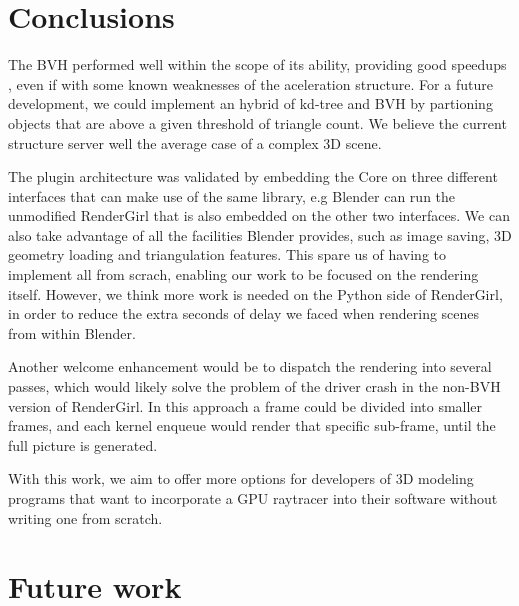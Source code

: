 \documentclass{vgtc}
\begin{document}
\section{Conclusions}
\label{sec:conclusion}

The BVH performed well within the scope of its ability, providing good
speedups , even if with some known weaknesses of the aceleration
structure. For a future development, we could implement an hybrid of
kd-tree and BVH by partioning objects that are above a given threshold
of triangle count. We believe the current structure server well the
average case of a complex 3D scene.

The plugin architecture was validated by embedding the Core on three
different interfaces that can make use of the same library, e.g
Blender can run the unmodified RenderGirl that is also embedded on the
other two interfaces. We can also take advantage of all the facilities
Blender provides, such as image saving, 3D geometry loading and
triangulation features. This spare us of having to implement all from
scrach, enabling our work to be focused on the rendering
itself. However, we think more work is needed on the Python side of
RenderGirl, in order to reduce the extra seconds of delay we faced
when rendering scenes from within Blender.

Another welcome enhancement would be to dispatch the rendering into
several passes, which would likely solve the problem of the driver
crash in the non-BVH version of RenderGirl. In this approach a frame
could be divided into smaller frames, and each kernel enqueue would
render that specific sub-frame, until the full picture is generated.

With this work, we aim to offer more options for developers of 3D
modeling programs that want to incorporate a GPU raytracer into their
software without writing one from scratch.

\section{Future work}
\label{sec:future}






\end{document}
